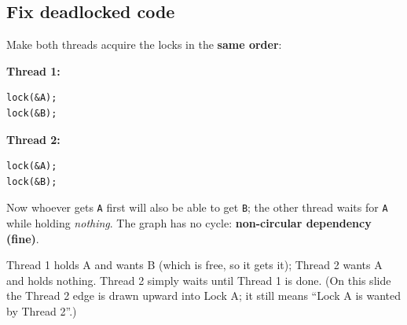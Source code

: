 \documentclass[11pt,a4paper]{article}
\begin{document}
\subsection{Fix deadlocked code}

\begin{quizbox}
Make both threads acquire the locks in the \textbf{same order}:

\begin{center}
\begin{minipage}[t]{0.4\textwidth}
\textbf{Thread 1:}
\begin{lstlisting}[numbers=none]
lock(&A);
lock(&B);
\end{lstlisting}
\end{minipage}\hspace{2em}
\begin{minipage}[t]{0.4\textwidth}
\textbf{Thread 2:}
\begin{lstlisting}[numbers=none]
lock(&A);
lock(&B);
\end{lstlisting}
\end{minipage}
\end{center}
\end{quizbox}

Now whoever gets \texttt{A} first will also be able to get \texttt{B}; the
other thread waits for \texttt{A} while holding \emph{nothing}. The graph has
no cycle: \textbf{non-circular dependency (fine)}.

\begin{center}
\end{center}

Thread 1 holds A and wants B (which is free, so it gets it); Thread 2 wants A
and holds nothing. Thread 2 simply waits until Thread 1 is done. (On this
slide the Thread 2 edge is drawn upward into Lock A; it still means
``Lock A is wanted by Thread 2''.)
\end{document}
